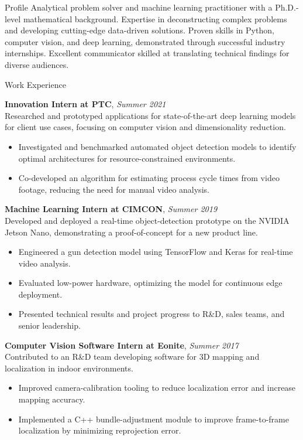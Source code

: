 \documentclass{resume} %
\begin{document}
\begin{rSection}{Profile}
Analytical problem solver and machine learning practitioner with a Ph.D.-level
mathematical background. Expertise in deconstructing complex problems and developing
cutting-edge data-driven solutions. Proven skills in Python, computer vision, and deep
learning, demonstrated through successful industry internships. Excellent communicator
skilled at translating technical findings for diverse audiences.
\end{rSection}


\begin{rSection}{Work Experience}

{\bf Innovation Intern at PTC}, {\it Summer 2021} \\ 
Researched and prototyped applications for state-of-the-art deep learning models for
client use cases, focusing on computer vision and dimensionality reduction. 
\begin{itemize} \itemsep -0.5em \vspace{-0.5em} 
    \item Investigated and benchmarked automated object detection models to identify
    optimal architectures for resource-constrained environments.
    \item Co-developed an algorithm for estimating process cycle times from 
    video footage, reducing the need for manual video analysis.
\end{itemize} 

{\bf Machine Learning Intern at CIMCON}, {\it Summer 2019} \\
Developed and deployed a real-time object-detection prototype on the NVIDIA Jetson 
Nano, demonstrating a proof-of-concept for a new product line.
\begin{itemize} \itemsep -0.5em \vspace{-0.5em}
    \item Engineered a gun detection model using TensorFlow and Keras for real-time
    video analysis.
    \item Evaluated low-power hardware, optimizing the model for continuous edge 
    deployment.
    \item Presented technical results and project progress to R\&D, sales teams, and senior leadership.
\end{itemize}

{\bf Computer Vision Software Intern at Eonite}, {\it Summer 2017} \\
Contributed to an R\&D team developing software for 3D mapping and localization in 
indoor environments.
\begin{itemize} \itemsep -0.5em \vspace{-0.5em} 
    \item Improved camera-calibration tooling to reduce localization error and 
    increase mapping accuracy. 
    \item Implemented a C++ bundle-adjustment module to improve frame-to-frame 
    localization by minimizing reprojection error.
\end{itemize}

\end{rSection}
\end{document}
